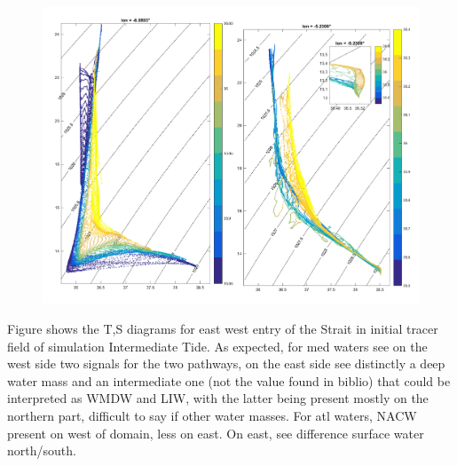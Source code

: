 \begin{figure}[!h]
        \includegraphics[width=\textwidth]{./GBR3D/WM_ini_IES.png}
        \caption{}
\end{figure}


Figure shows the T,S diagrams for east west entry of the Strait in initial tracer field of simulation Intermediate Tide. As expected, for med waters see on the west side two signals for the two pathways, on the east side see distinctly a deep water mass and an intermediate one (not the value found in biblio) that could be interpreted as WMDW and LIW, with the latter being present mostly on the northern part, difficult to say if other water masses. For atl waters, NACW present on west of domain, less on east. On east, see difference surface water north/south.





